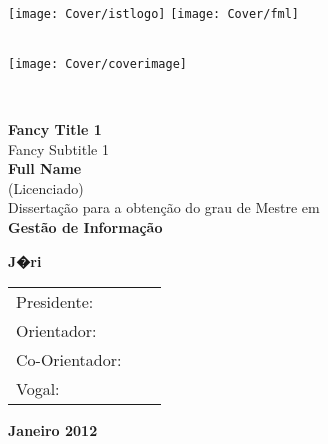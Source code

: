 \setcounter{page}{1} 


\thispagestyle{empty}
\begin{flushleft} ~\\ \vspace{-10mm} \hspace{-9mm}  \texttt{[image: Cover/istlogo]} \hspace{49mm}  \texttt{[image: Cover/fml]} 
\\ \vspace{5mm}
~\\ \begin{center} \texttt{[image: Cover/coverimage]}  \end{center} %
~\\ \vspace{5mm}
\begin{centering}
\LARGE \textbf{Fancy Title 1}
\\ \vspace{5mm}
\Large Fancy Subtitle 1
\\ \vspace{15mm}
\Large \textbf{Full Name} \\
(Licenciado)
\\ \vspace{15mm}
\Large Dissertação para a obtenção do grau de Mestre em
\\ \vspace{2mm}
\LARGE \textbf{Gestão de Informação}
\\ \vspace{20mm}

\Large \textbf{J�ri}

\begin{tabular}{lcl}
\large Presidente:		&   & \large \\ 
\large Orientador: 		&   & \large \\ 
\large Co-Orientador: &   & \large \\ 
\large Vogal:	 				&   & \large \\
\end{tabular}
 
\vspace{9mm}

\Large \textbf{Janeiro 2012} \\
\end{centering}
\let\thepage\relax
\end{flushleft}
\pagebreak


